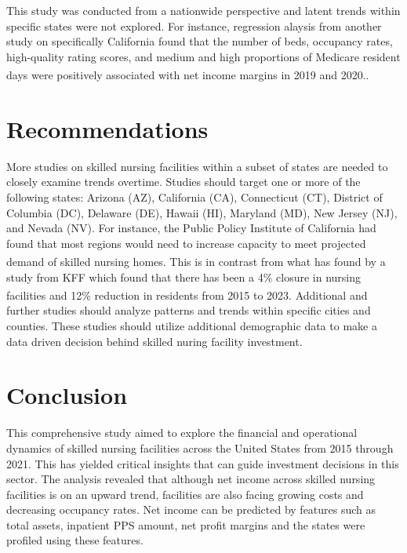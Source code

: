 \documentclass{article}
\theoremstyle{mytheoremstyle}
\theoremstyle{mytheoremstyle}
\theoremstyle{myproblemstyle}
\begin{document}
This study was conducted from a nationwide perspective and latent trends within specific states were not explored. For instance, regression alaysis from another study on specifically California  found that the number of beds, occupancy rates, high-quality rating scores, and medium and high proportions of Medicare resident days were positively associated with net income margins in 2019 and 2020.\textsuperscript{\cite{Harrington2023}}. 

\pagebreak
\section{Recommendations}

More studies on skilled nursing facilities within a subset of states are needed to closely examine trends overtime. Studies should target one or more of the following states: Arizona (AZ), California (CA), Connecticut (CT), District of Columbia (DC), Delaware (DE), Hawaii (HI), Maryland (MD), New Jersey (NJ), and Nevada (NV). For instance, the Public Policy Institute of California had found that most regions would need to increase capacity to meet projected demand of skilled nursing homes\textsuperscript{\cite{ppic2024}}. This is in contrast from what has found by a study from KFF which found that there has been a 4\% closure in nursing facilities and 12\% reduction in residents from 2015 to 2023\textsuperscript{\cite{kff2024}}. Additional and further studies should analyze patterns and trends within specific cities and counties. These studies should utilize additional demographic data to make a data driven decision behind skilled nuring facility investment. 


\pagebreak
\section{Conclusion}
This comprehensive study aimed to explore the financial and operational dynamics of skilled nursing facilities across the United States from 2015 through 2021. This has yielded critical insights that can guide investment decisions in this sector. The analysis revealed that although net income across skilled nursing facilities is on an upward trend, facilities are also facing growing costs and decreasing occupancy rates. Net income can be predicted by features such as total assets, inpatient PPS amount, net profit margins and the states were profiled using these features.
\end{document}
